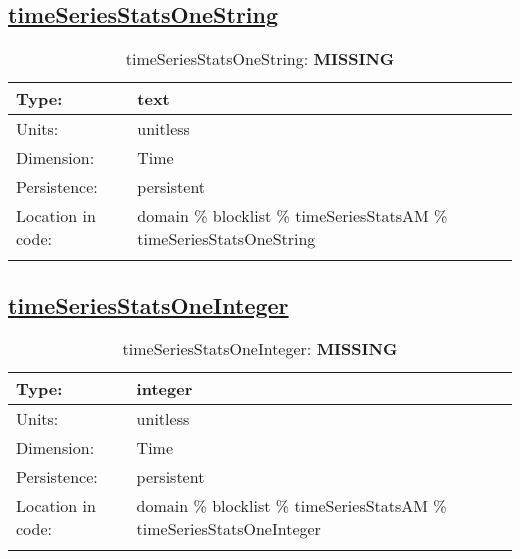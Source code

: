 \subsection[timeSeriesStatsOneString]{\hyperref[sec:var_tab_timeSeriesStatsAM]{timeSeriesStatsOneString}}
\label{subsec:var_sec_timeSeriesStatsAM_timeSeriesStatsOneString}
\begin{center}
\begin{longtable}{| p{2.0in} | p{4.0in} |}
        \hline 
        Type: & text \\
        \hline 
        Units: & \si{unitless} \\
        \hline 
        Dimension: & Time \\
        \hline 
        Persistence: & persistent \\
        \hline 
         Location in code: & domain \% blocklist \% timeSeriesStatsAM \% timeSeriesStatsOneString \\
         \hline 
    \caption{timeSeriesStatsOneString: {\bf \color{red} MISSING}}
\end{longtable}
\end{center}
\subsection[timeSeriesStatsOneInteger]{\hyperref[sec:var_tab_timeSeriesStatsAM]{timeSeriesStatsOneInteger}}
\label{subsec:var_sec_timeSeriesStatsAM_timeSeriesStatsOneInteger}
\begin{center}
\begin{longtable}{| p{2.0in} | p{4.0in} |}
        \hline 
        Type: & integer \\
        \hline 
        Units: & \si{unitless} \\
        \hline 
        Dimension: & Time \\
        \hline 
        Persistence: & persistent \\
        \hline 
         Location in code: & domain \% blocklist \% timeSeriesStatsAM \% timeSeriesStatsOneInteger \\
         \hline 
    \caption{timeSeriesStatsOneInteger: {\bf \color{red} MISSING}}
\end{longtable}
\end{center}
